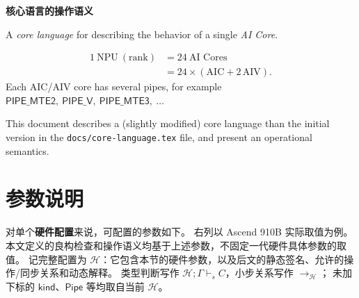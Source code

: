 \documentclass[UTF8,a4paper,11pt,fontset=fandol]{ctexart}
\begin{document}
\begin{center}
\Large\bfseries 核心语言的操作语义
\end{center}


\noindent

A \emph{core language} for describing the behavior of a single \emph{AI Core}.

\[
\begin{aligned}
1\ \mathrm{NPU}\ (\mathrm{rank})
  &= 24\ \text{AI Cores}\\
  &= 24\times(\mathrm{AIC}+2\,\mathrm{AIV}).
\end{aligned}
\]
Each AIC/AIV core has several pipes, for example
$
\mathsf{PIPE\_MTE2},\ \mathsf{PIPE\_V},\ \mathsf{PIPE\_MTE3},\ \ldots
$

This document describes a (slightly modified) core language than the initial
version in the \texttt{docs/core-language.tex} file, and present an operational semantics.

\section{参数说明}

对单个\textbf{硬件配置}来说，可配置的参数如下。
右列以 Ascend 910B 实际取值为例。
本文定义的良构检查和操作语义均基于上述参数，不固定一代硬件具体参数的取值。
记完整配置为 $\mathcal H$：它包含本节的硬件参数，以及后文的静态签名、允许的操作/同步关系和动态解释。
类型判断写作 $\mathcal H;\Gamma\vdash_s C$，小步关系写作 $\longrightarrow_{\mathcal H}$；
未加下标的 $\mathsf{kind}$、$\mathsf{Pipe}$ 等均取自当前 $\mathcal H$。
\end{document}
